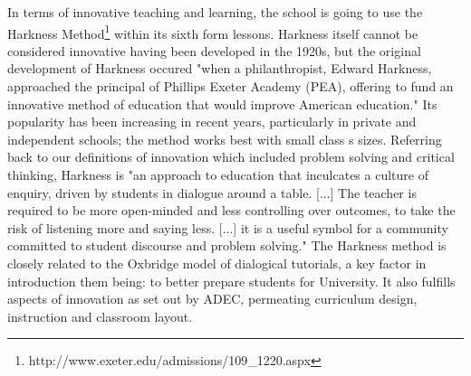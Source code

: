 In terms of innovative teaching and learning, the school is going to use the Harkness Method\footnote{http://www.exeter.edu/admissions/109\_1220.aspx} within its sixth form lessons. Harkness itself cannot be considered innovative having been developed in the 1920s, but the original development of Harkness occured "when a philanthropist, Edward Harkness, approached the principal of Phillips Exeter Academy (PEA), offering to fund an innovative method of education that would improve American education." \cite{Sevigny2016} Its popularity has been increasing in recent years, particularly in private and independent schools; the method works best with small class s sizes. Referring back to our definitions of innovation which included problem solving and critical thinking, Harkness is "an approach to education that inculcates a culture of enquiry, driven by students in dialogue around a table. [...] The teacher is required to be more open-minded and less controlling over outcomes, to take the risk of listening more and saying less. [...] it is a useful symbol for a community committed to student discourse and problem solving." \cite{Williams2010} The Harkness method is closely related to the Oxbridge model of dialogical tutorials, a key factor in introduction them being: to better prepare students for University. It also fulfills aspects of innovation as set out by ADEC, permeating curriculum design, instruction and classroom layout. 

